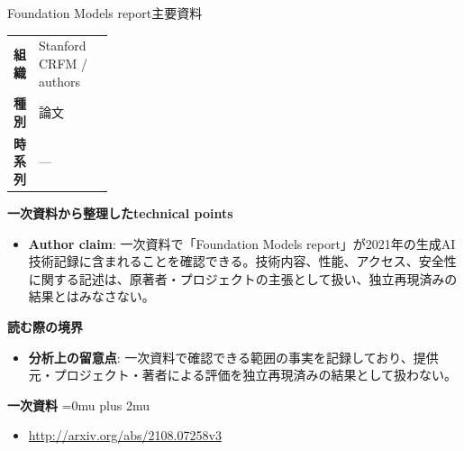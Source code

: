 \begin{technicalnote}{Foundation Models report}{主要資料}
\begingroup
\begin{tabularx}{\linewidth}{@{}>{\bfseries}p{0.22\linewidth}X@{}}
組織 & Stanford CRFM / authors \\
種別 & 論文 \\
時系列 & — \\
\end{tabularx}
\smallskip
{\bfseries 一次資料から整理したtechnical points}
\begin{itemize}[leftmargin=1.5em,itemsep=0.35em]
\item \textbf{Author claim}: 一次資料で「Foundation Models report」が2021年の生成AI技術記録に含まれることを確認できる。技術内容、性能、アクセス、安全性に関する記述は、原著者・プロジェクトの主張として扱い、独立再現済みの結果とはみなさない。
\end{itemize}
\begin{minipage}{\linewidth}
{\bfseries 読む際の境界}
\begin{itemize}[leftmargin=1.5em,itemsep=0.35em]
\item \textbf{分析上の留意点}: 一次資料で確認できる範囲の事実を記録しており、提供元・プロジェクト・著者による評価を独立再現済みの結果として扱わない。
\end{itemize}
\begin{samepage}
{\bfseries 一次資料}
\begingroup\sloppy
\Urlmuskip=0mu plus 2mu\relax
\begin{itemize}[leftmargin=1.5em,itemsep=0.25em]
\item {\scriptsize\url{http://arxiv.org/abs/2108.07258v3}}
\end{itemize}
\endgroup
\end{samepage}
\end{minipage}
\endgroup
\end{technicalnote}
\medskip

